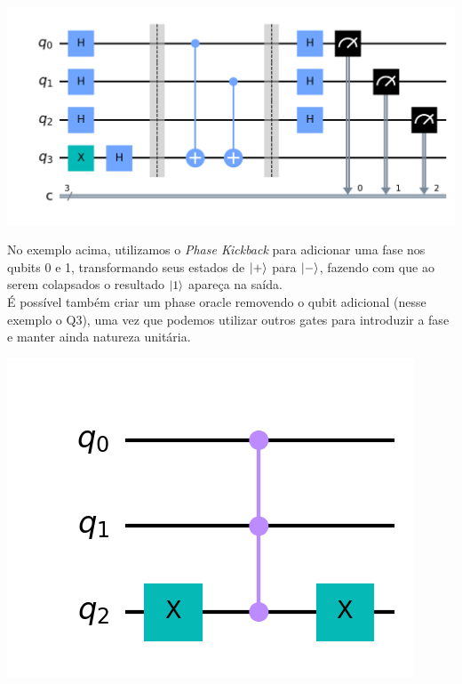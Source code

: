 \documentclass{article}
\begin{document}
\begin{center}
	\includegraphics[scale=0.3]{phase_oracle_1.png}
	\label{fig:phase-oracle-1}
\end{center}

No exemplo acima, utilizamos o \textit{Phase Kickback} para adicionar uma fase nos qubits 0 e 1, transformando seus estados de $\mathinner{|{+}\rangle}$ para $\mathinner{|{-}\rangle}$, fazendo com que ao serem colapsados o resultado $\mathinner{|{1}\rangle}$ apareça na saída.\\

É possível também criar um phase oracle removendo o qubit adicional (nesse exemplo o Q3), uma vez que podemos utilizar outros gates para introduzir a fase e manter ainda natureza unitária.

\begin{center}
	\includegraphics[scale=0.3]{phase_oracle_2.png}
	\label{fig:phase-oracle-2}
\end{center}
\end{document}
